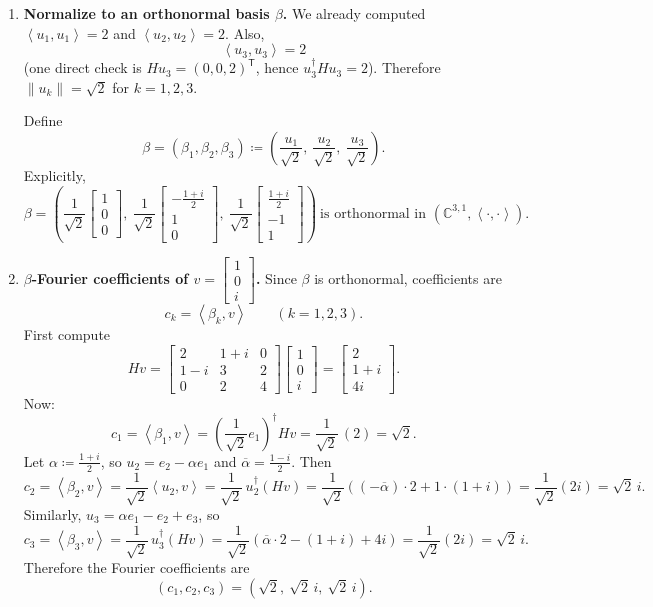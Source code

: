 \documentclass[12pt]{article}
\newcommand{\df}{\coloneqq}
\newcommand{\C}{\mathbb{C}}
\newcommand{\ip}[2]{\left\langle #1,#2\right\rangle}
\begin{document}
\begin{enumerate}[label=(\alph*)]
\item \textbf{Normalize to an orthonormal basis $\beta$.}
We already computed $\ip{u_1}{u_1}=2$ and $\ip{u_2}{u_2}=2$.
Also,
\[
\ip{u_3}{u_3}=2
\]
(one direct check is $Hu_3=(0,0,2)^{\mathsf T}$, hence $u_3^\dagger Hu_3=2$).
Therefore $\|u_k\|=\sqrt2$ for $k=1,2,3$.

Define
\[
\beta=(\beta_1,\beta_2,\beta_3)\df \left(\frac{u_1}{\sqrt2},\ \frac{u_2}{\sqrt2},\ \frac{u_3}{\sqrt2}\right).
\]
Explicitly,
\[
\boxed{
\beta=
\left(
\frac{1}{\sqrt2}\!\begin{bmatrix}1\\0\\0\end{bmatrix},\ 
\frac{1}{\sqrt2}\!\begin{bmatrix}-\frac{1+i}{2}\\1\\0\end{bmatrix},\ 
\frac{1}{\sqrt2}\!\begin{bmatrix}\frac{1+i}{2}\\-1\\1\end{bmatrix}
\right)
\ \text{is orthonormal in }(\C^{3,1},\ip{\cdot}{\cdot}).
}
\]

\item \textbf{$\beta$-Fourier coefficients of $v=\begin{bmatrix}1\\0\\ i\end{bmatrix}$.}
Since $\beta$ is orthonormal, coefficients are
\[
c_k=\ip{\beta_k}{v}\qquad (k=1,2,3).
\]
First compute
\[
Hv=
\begin{bmatrix}
2 & 1+i & 0\\
1-i & 3 & 2\\
0 & 2 & 4
\end{bmatrix}
\begin{bmatrix}1\\0\\ i\end{bmatrix}
=
\begin{bmatrix}
2\\
1+i\\
4i
\end{bmatrix}.
\]
Now:
\[
c_1=\ip{\beta_1}{v}
=\left(\frac{1}{\sqrt2}e_1\right)^\dagger Hv
=\frac{1}{\sqrt2}\,(2)=\sqrt2.
\]
Let $\alpha\df \frac{1+i}{2}$, so $u_2=e_2-\alpha e_1$ and $\overline{\alpha}=\frac{1-i}{2}$.
Then
\[
c_2=\ip{\beta_2}{v}
=\frac{1}{\sqrt2}\ip{u_2}{v}
=\frac{1}{\sqrt2}\,u_2^\dagger(Hv)
=\frac{1}{\sqrt2}\left((-\overline{\alpha})\cdot 2 + 1\cdot (1+i)\right)
=\frac{1}{\sqrt2}(2i)=\sqrt2\,i.
\]
Similarly, $u_3=\alpha e_1-e_2+e_3$, so
\[
c_3=\ip{\beta_3}{v}
=\frac{1}{\sqrt2}\,u_3^\dagger(Hv)
=\frac{1}{\sqrt2}\left(\overline{\alpha}\cdot 2 - (1+i) + 4i\right)
=\frac{1}{\sqrt2}(2i)=\sqrt2\,i.
\]
Therefore the Fourier coefficients are
\[
\boxed{\, (c_1,c_2,c_3)=\left(\sqrt2,\ \sqrt2\,i,\ \sqrt2\,i\right).\,}
\]
\end{enumerate}
\end{document}
